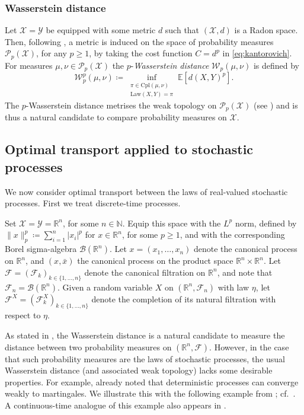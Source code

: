 \documentclass[onseside, final]{amsart}
\theoremstyle{definition}
\newcommand{\F}{\mathcal F}
\newcommand{\X}{\mathcal X}
\newcommand{\Y}{\mathcal Y}
\newcommand{\B}{\mathcal B}
\newcommand{\Pc}{\mathcal P}
\newcommand{\N}{\mathbb N}
\newcommand{\R}{\mathbb R}
\newcommand{\E}{\mathbb E}
\newcommand{\Law}{\mathrm{Law}}
\newcommand{\W}{\mathcal W}
\newcommand{\cpl}{\mathrm{Cpl}}
\numberwithin{equation}{section}
\begin{document}
		\subsubsection{Wasserstein distance}\label{sec:wasserstein}
			Let $\X = \Y$ be equipped with some metric $d$ such that $(\X, d)$ is a Radon space. Then, following \citep[Section 7.1]{AGS}, a metric is induced on the space of probability measures $\Pc_p(\X)$, for any $p \geq 1$, by taking the cost function $C = d^p$ in \eqref{eq:kantorovich}. For measures $\mu, \nu \in \Pc_p(\X)$ the $p$-\emph{Wasserstein distance} $\W_p(\mu, \nu)$ is defined by
			\begin{equation}\label{eq:wass}
				\W_p^p(\mu, \nu) \coloneqq \inf_{\substack{\pi \in \cpl(\mu, \nu)\\\Law(X, Y) = \pi}}\E[d(X, Y)^p].
			\end{equation}
			The $p$-Wasserstein distance metrises the weak topology on $\Pc_p(\X)$ (see \cite[Proposition 7.1.5]{AGS}) and is thus a natural candidate to compare probability measures on $\X$.
	
	\subsection{Optimal transport applied to stochastic processes}\label{sec:OT-bc}
	
		We now consider optimal transport between the laws of real-valued stochastic processes.
		First we treat discrete-time processes.
		
		Set $\X = \Y = \R^n$, for some $n \in \N$. Equip this space with the $L^p$ norm, defined by $\|x\|_p^p \coloneqq \sum_{i = 1}^n|x_i|^p$ for $x \in \R^n$, for some $p \geq 1$, and with the corresponding Borel sigma-algebra $\B(\R^n)$. Let $x = (x_1, \dotsc, x_n)$ denote the canonical process on $\R^n$, and $(x, \bar x)$ the canonical process on the product space $\R^n \times \R^n$. Let $\F = (\F_k)_{k \in \{1, \dotsc, n\}}$ denote the canonical filtration on $\R^n$, and note that $\F_n = \B(\R^n)$. Given a random variable $X$ on $(\R^n, \F_n)$ with law $\eta$, let  $\F^X = (\F^X_k)_{k \in \{1, \dotsc, n\}}$ denote the completion of its natural filtration with respect to $\eta$.
		
		As stated in , the Wasserstein distance is a natural candidate to measure the distance between two probability measures on $(\R^n, \F)$. However, in the case that such probability measures are the laws of stochastic processes, the usual Wasserstein distance (and associated weak topology) lacks some desirable properties. For example, \citet[Section 11]{Al81} already noted that deterministic processes can converge weakly to martingales. We illustrate this with the following example from \citet{BaBaBeEd19a}; cf.~\citet[Example 11.4]{Al81}. A continuous-time analogue of this example also appears in \citet[Example 5.1]{BaKaRo22}.
				
\end{document}
